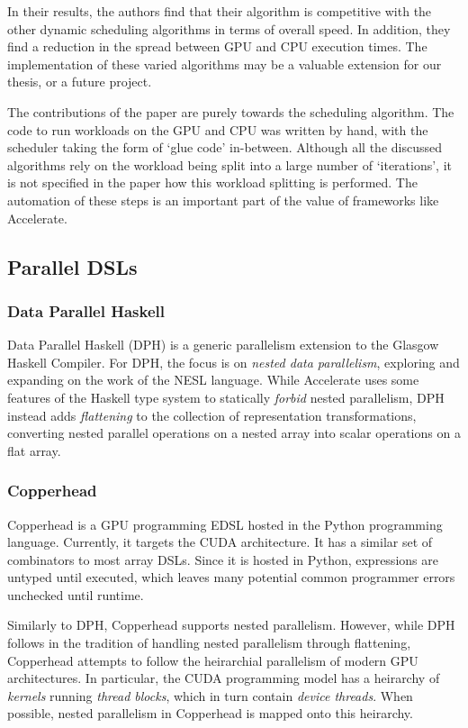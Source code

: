 \documentclass[a4paper,12pt]{article}
\begin{document}
In their results, the authors find that their algorithm is competitive with the other dynamic scheduling algorithms in terms of overall speed.
In addition, they find a reduction in the spread between GPU and CPU execution times.
The implementation of these varied algorithms may be a valuable extension for our thesis, or a future project.

The contributions of the paper are purely towards the scheduling algorithm.
The code to run workloads on the GPU and CPU was written by hand, with the scheduler taking the form of `glue code' in-between.
Although all the discussed algorithms rely on the workload being split into a large number of  `iterations', it is not specified in the paper how this workload splitting is performed.
The automation of these steps is an important part of the value of frameworks like Accelerate.

\subsection{Parallel DSLs}

\subsubsection*{Data Parallel Haskell}
Data Parallel Haskell (DPH) is a generic parallelism extension to the Glasgow Haskell Compiler.
For DPH, the focus is on \textit{nested data parallelism}, exploring and expanding on the work of the NESL language. \citep{chakravarty_data_2007}
While Accelerate uses some features of the Haskell type system to statically \textit{forbid} nested parallelism, DPH instead adds \textit{flattening} to the collection of representation transformations, converting nested parallel operations on a nested array into scalar operations on a flat array.

\subsubsection*{Copperhead}
Copperhead is a GPU programming EDSL hosted in the Python programming language. \citep{catanzaro_copperhead:_2011}
Currently, it targets the CUDA architecture.
It has a similar set of combinators to most array DSLs.
Since it is hosted in Python, expressions are untyped until executed, which leaves many potential common programmer errors unchecked until runtime.

Similarly to DPH, Copperhead supports nested parallelism.
However, while DPH follows in the tradition of handling nested parallelism through flattening, Copperhead attempts to follow the heirarchial parallelism of modern GPU architectures.
In particular, the CUDA programming model has a heirarchy of \textit{kernels} running \textit{thread blocks}, which in turn contain \textit{device threads}.
When possible, nested parallelism in Copperhead is mapped onto this heirarchy.
\end{document}
